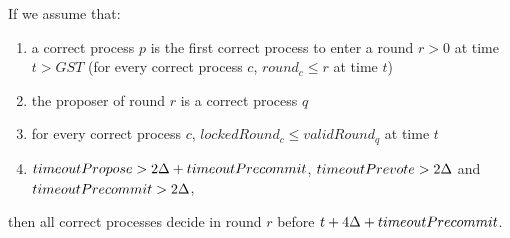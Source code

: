 \begin{lemma} \label{lemma:round-synchronisation} If we assume that:
\begin{enumerate} 
    \item a correct process $p$ is the first correct process to
            enter a round $r>0$ at time $t > GST$ (for every correct process
            $c$, $round_c \le r$ at time $t$) 
    \item the proposer of round $r$ is
            a correct process $q$ 
    \item for every correct process $c$,
            $lockedRound_c \le validRound_q$ at time $t$ 
    \item $timeoutPropose
                > 2\Delta + timeoutPrecommit$, $timeoutPrevote > 2\Delta$ and
                $timeoutPrecommit > 2\Delta$, 
\end{enumerate} 
then all correct processes decide in round $r$ before $t + 4\Delta +
        timeoutPrecommit$.  
\end{lemma}	

